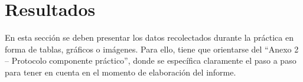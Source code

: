 \section{Resultados}

En esta sección se deben presentar los datos recolectados durante la práctica en
forma de tablas, gráficos o imágenes. Para ello, tiene que orientarse del ``Anexo 2 –
Protocolo componente práctico'', donde se específica claramente el paso a paso para
tener en cuenta en el momento de elaboración del informe.